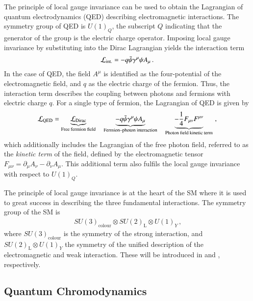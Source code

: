 The principle of local gauge invariance can be used to obtain the Lagrangian of
quantum electrodynamics (QED) describing electromagnetic interactions. The
symmetry group of QED is $U(1)_{Q}$, the subscript $Q$ indicating that the
generator of the group is the electric charge operator. Imposing local gauge
invariance by substituting  into the Dirac
Lagrangian yields the interaction term
\begin{align*}
  \mathcal{L}_{\text{int.}} = - q \bar{\psi} \gamma^\mu \psi A_\mu \,\text{.}
\end{align*}
In the case of QED, the field $A^\mu$ is identified as the four-potential of the
electromagnetic field, and $q$ as the electric charge of the fermion.
Thus, the interaction term describes the coupling between photons and fermions
with electric charge $q$. For a single type of fermion, the Lagrangian of QED is
given by
\begin{align*}
  \mathcal{L}_{\text{QED}} = \underbrace{\mathcal{L}_{\text{Dirac}}}_{\text{Free fermion field}}
  \hspace*{1em}
  \underbrace{- q \bar{\psi} \gamma^\mu \psi A_\mu}_{\text{Fermion--photon interaction}}
  \hspace*{1em}
  \underbrace{- \frac{1}{4} F_{\mu\nu} F^{\mu\nu}}_{\text{Photon field kinetic term}} \,\text{,}
\end{align*}
which additionally includes the Lagrangian of the free photon field, referred to
as the \emph{kinetic term} of the field, defined by the electromagnetic tensor
$F_{\mu\nu} = \partial_\mu A_\nu - \partial_\nu A_\mu$. This additional term
also fulfils the local gauge invariance with respect to $U(1)_Q$.

The principle of local gauge invariance is at the heart of the SM where it is
used to great success in describing the three fundamental interactions. The
symmetry group of the SM is
\begin{align*}
  SU(3)_{\text{colour}} \otimes SU(2)_{\text{L}} \otimes U(1)_Y \,\text{,}
\end{align*}
where $SU(3)_{\text{colour}}$ is the symmetry of the strong interaction, and
$SU(2)_{\text{L}} \otimes U(1)_Y$ the symmetry of the unified description of the
electromagnetic and weak interaction. These will be introduced in
 and , respectively.


\subsection{Quantum Chromodynamics}%
\label{sec:theory_qcd}


